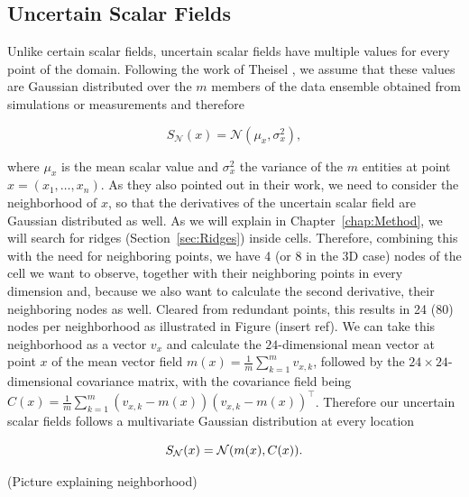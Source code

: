 \subsection{Uncertain Scalar Fields}\label{sec:USF}

Unlike certain scalar fields, uncertain scalar fields have multiple
values for every point of the domain. Following the work of Theisel
, we assume that these values are Gaussian
distributed over the $m$ members of the data ensemble obtained from
simulations or measurements and therefore

\begin{equation}
  S_{\mathcal{N}}(x) = \mathcal{N}(\mu_{x}, \sigma_{x}^2),
\end{equation}

\noindent where $\mu_x$ is the mean scalar value and $\sigma_{x}^2$ the
variance of the $m$ entities at point $x = (x_1,\dots,x_n)$. As they
also pointed out in their work, we need to consider the neighborhood of
$x$, so that the derivatives of the uncertain scalar field are Gaussian
distributed as well. As we will explain in Chapter~\ref{chap:Method}, we
will search for ridges (Section~\ref{sec:Ridges}) inside cells.
Therefore, combining this with the need for neighboring points, we have
4 (or 8 in the 3D case) nodes of the cell we want to observe, together
with their neighboring points in every dimension and, because we also
want to calculate the second derivative, their neighboring nodes as
well. Cleared from redundant points, this results in 24 (80) nodes per
neighborhood as illustrated in Figure (insert ref). We can take this
neighborhood as a vector $v_x$ and calculate the $24$-dimensional mean
vector at point $x$ of the mean vector field $m(x) = \frac{1}{m}
\sum_{k=1}^m v_{x,k}$, followed by the $24 \times 24$-dimensional
covariance matrix, with the covariance field being $C(x)= \frac{1}{m}
\sum_{k=1}^m (v_{x,k} - m(x)){(v_{x,k} - m{(x)})}^\top$. Therefore our
uncertain scalar fields follows a multivariate Gaussian distribution
at every location

\begin{equation}
  S_{\mathcal{N}}(x) = \mathcal{N}(m(x), C(x)).\\
\end{equation}

(Picture explaining neighborhood)

